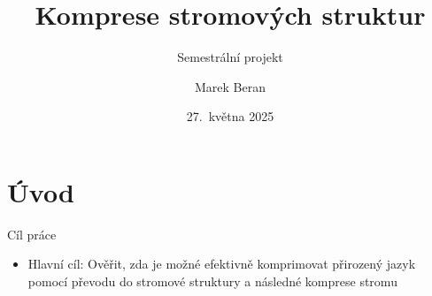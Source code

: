 \documentclass[lualatex,hyperref={pdfencoding=auto}]{beamer}
\title[Komprese stromových struktur]{Komprese stromových struktur}
\subtitle{Semestrální projekt}
\author{Marek Beran}
\institute[VŠB-TUO]{VŠB -- Technická univerzita Ostrava\\\vspace{2mm}marek.beran.st@vsb.cz}
\date[27.~5.~2025]{27.~května 2025}
\begin{document}
\section{Úvod}


\begin{frame}{Cíl práce}
\begin{itemize}
  \item Hlavní cíl: Ověřit, zda je možné efektivně komprimovat přirozený jazyk pomocí převodu do stromové struktury a následné komprese stromu
\end{itemize}

\end{frame}

            
\end{document}
